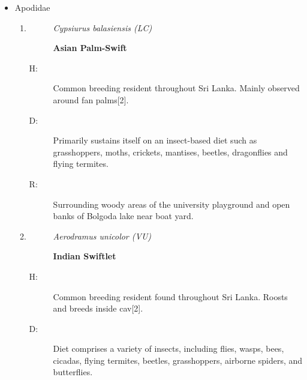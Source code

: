 \begin{itemize}
\begin{enumerate}
\begin{description}
\item[]%
\textit{Anhinga melanogaster (LC)}%
\item[]%
\textbf{Oriental Darter}%
\end{description}%
\begin{description}%
\item[H: ]%
Uncommon breeeding resident in dry lowlands. Very rarely observed in wet lowlands and high hills. Tanks, lakes, larger rivers and lagoons are the preferred habitat{[}2{]}.%
\item[D: ]%
Mainly fish, particularly snakeheads and mudfish.%
\item[R: ]%
boat yard and the surrounding areas of Bolgoda lake.%
\end{description}%
\end{enumerate}%
\item%
Apodidae%
\begin{enumerate}%
\item%
\begin{description}%
\item[]%
\textit{Cypsiurus balasiensis (LC)}%
\item[]%
\textbf{Asian Palm{-}Swift}%
\end{description}%
\begin{description}%
\item[H: ]%
Common breeding resident throughout Sri Lanka. Mainly observed around fan palms{[}2{]}.%
\item[D: ]%
Primarily sustains itself on an insect{-}based diet such as grasshoppers, moths, crickets, mantises, beetles, dragonflies and flying termites.%
\item[R: ]%
Surrounding woody areas of the university playground and open banks of Bolgoda lake near boat yard.%
\end{description}%
\item%
\begin{description}%
\item[]%
\textit{Aerodramus unicolor (VU)}%
\item[]%
\textbf{Indian Swiftlet}%
\end{description}%
\begin{description}%
\item[H: ]%
Common breeding resident found throughout Sri Lanka. Roosts and breeds inside cav{[}2{]}.%
\item[D: ]%
Diet comprises a variety of insects, including flies, wasps, bees, cicadas, flying termites, beetles, grasshoppers, airborne spiders, and butterflies.%

\end{description}
\end{enumerate}
\end{itemize}
